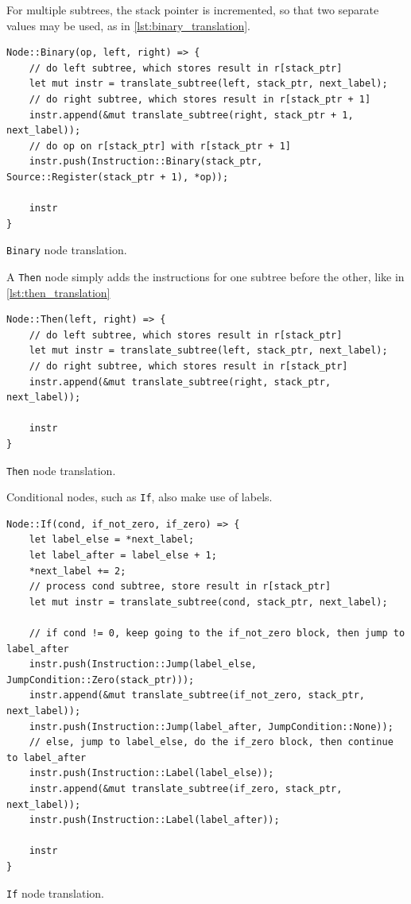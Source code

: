 \documentclass{report}
\newenvironment{code}{\captionsetup{type=listing}}{}
\begin{document}
For multiple subtrees, the stack pointer is incremented, so that two separate values may be used, as in \autoref{lst:binary_translation}.

\begin{code}
    \begin{verbatim}
Node::Binary(op, left, right) => {
    // do left subtree, which stores result in r[stack_ptr]
    let mut instr = translate_subtree(left, stack_ptr, next_label);
    // do right subtree, which stores result in r[stack_ptr + 1]
    instr.append(&mut translate_subtree(right, stack_ptr + 1, next_label));
    // do op on r[stack_ptr] with r[stack_ptr + 1]
    instr.push(Instruction::Binary(stack_ptr, Source::Register(stack_ptr + 1), *op));

    instr
}
    \end{verbatim}
    \caption{\texttt{Binary} node translation.}
    \label{lst:binary_translation}
\end{code}

A \verb|Then| node simply adds the instructions for one subtree before the other, like in \autoref{lst:then_translation}

\begin{code}
    \begin{verbatim}
Node::Then(left, right) => {
    // do left subtree, which stores result in r[stack_ptr]
    let mut instr = translate_subtree(left, stack_ptr, next_label);
    // do right subtree, which stores result in r[stack_ptr]
    instr.append(&mut translate_subtree(right, stack_ptr, next_label));

    instr
}
    \end{verbatim}
    \caption{\texttt{Then} node translation.}
    \label{lst:then_translation}
\end{code}

Conditional nodes, such as \verb|If|, also make use of labels.

\begin{code}
    \begin{verbatim}
Node::If(cond, if_not_zero, if_zero) => {
    let label_else = *next_label;
    let label_after = label_else + 1;
    *next_label += 2;
    // process cond subtree, store result in r[stack_ptr]
    let mut instr = translate_subtree(cond, stack_ptr, next_label);

    // if cond != 0, keep going to the if_not_zero block, then jump to label_after
    instr.push(Instruction::Jump(label_else, JumpCondition::Zero(stack_ptr)));
    instr.append(&mut translate_subtree(if_not_zero, stack_ptr, next_label));
    instr.push(Instruction::Jump(label_after, JumpCondition::None));
    // else, jump to label_else, do the if_zero block, then continue to label_after
    instr.push(Instruction::Label(label_else));
    instr.append(&mut translate_subtree(if_zero, stack_ptr, next_label));
    instr.push(Instruction::Label(label_after));

    instr
}
    \end{verbatim}
    \caption{\texttt{If} node translation.}
    \label{lst:if_translation}
\end{code}
\end{document}

